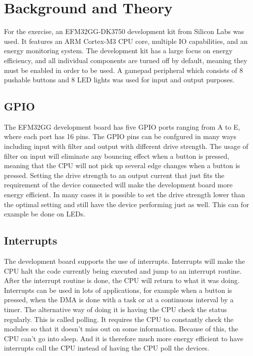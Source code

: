 \chapter{Background and Theory}

For the exercise, an EFM32GG-DK3750 development kit from Silicon Labs was used. It features an ARM Cortex-M3 CPU core, multiple IO capabilities, and an energy monitoring system. The development kit has a large focus on energy efficiency, and all individual components are turned off by default, meaning they must be enabled in order to be used. A gamepad peripheral which consists of 8 pushable buttons and 8 LED lights was used for input and output purposes. 

\section{GPIO}
The EFM32GG development board has five GPIO ports ranging from A to E, where each port has 16 pins. The GPIO pins can be confgured in many ways including input with filter and output with different drive strength. The usage of filter on input will eliminate any bouncing effect when a button is pressed, meaning that the CPU will not pick up several edge changes when a button is pressed. Setting the drive strength to an output current that just fits the requirement of the device connected will make the development board more energy efficient. In many cases it is possible to set the drive strength lower than the optimal setting and still have the device performing just as well. This can for example be done on LEDs.

\section{Interrupts}
The development board supports the use of interrupts. Interrupts will make the CPU halt the code currently being executed and jump to an interrupt routine. After the interrupt routine is done, the CPU will return to what it was doing. Interrupts can be used in lots of applications, for example when a button is pressed, when the DMA is done with a task or at a continuous interval by a timer. The alternative way of doing it is having the CPU check the status regularly. This is called polling. It requires the CPU to constantly check the modules so that it doesn't miss out on some information. Because of this, the CPU can't go into sleep. And it is therefore much more energy efficient to have interrupts call the CPU instead of having the CPU poll the devices.

